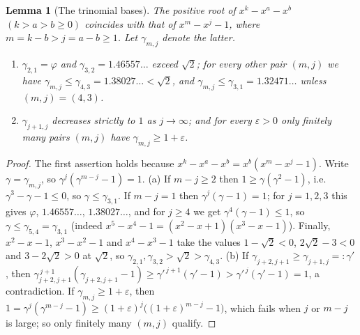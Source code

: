 \documentclass[11pt]{amsart}
\newtheorem{lemma}{Lemma}[section]
\theoremstyle{definition}
\theoremstyle{remark}
\begin{document}
\begin{lemma}[The trinomial bases]\label{lem:trinroots}
The positive root of $x^k-x^a-x^b$ $(k>a>b\ge0)$ coincides with that of $x^m-x^j-1$, where
$m=k-b>j=a-b\ge1$. Let $\gamma_{m,j}$ denote the latter.
\begin{enumerate}[label=(\alph*)]
\item $\gamma_{2,1}=\varphi$ and $\gamma_{3,2}=1.46557\ldots$ exceed $\sqrt2$; for every other
pair $(m,j)$ we have $\gamma_{m,j}\le\gamma_{4,3}=1.38027\ldots<\sqrt2$, and
$\gamma_{m,j}\le\gamma_{3,1}=1.32471\ldots$ unless $(m,j)=(4,3)$.
\item $\gamma_{j+1,j}$ decreases strictly to $1$ as $j\to\infty$; and for every
$\varepsilon>0$ only finitely many pairs $(m,j)$ have $\gamma_{m,j}\ge1+\varepsilon$.
\end{enumerate}
\end{lemma}

\begin{proof}
The first assertion holds because $x^k-x^a-x^b=x^b(x^m-x^j-1)$. Write $\gamma=\gamma_{m,j}$,
so $\gamma^j(\gamma^{m-j}-1)=1$.
(a) If $m-j\ge2$ then $1\ge\gamma(\gamma^2-1)$, i.e.\ $\gamma^3-\gamma-1\le0$, so
$\gamma\le\gamma_{3,1}$. If $m-j=1$ then $\gamma^j(\gamma-1)=1$; for $j=1,2,3$ this gives
$\varphi$, $1.46557\ldots$, $1.38027\ldots$, and for $j\ge4$ we get $\gamma^4(\gamma-1)\le1$,
so $\gamma\le\gamma_{5,4}=\gamma_{3,1}$ (indeed $x^5-x^4-1=(x^2-x+1)(x^3-x-1)$). Finally,
$x^2-x-1$, $x^3-x^2-1$ and $x^4-x^3-1$ take the values $1-\sqrt2<0$, $2\sqrt2-3<0$ and
$3-2\sqrt2>0$ at $\sqrt2$, so $\gamma_{2,1},\gamma_{3,2}>\sqrt2>\gamma_{4,3}$.
(b) If $\gamma_{j+2,j+1}\ge\gamma_{j+1,j}=:\gamma'$, then
$\gamma_{j+2,j+1}^{\,j+1}(\gamma_{j+2,j+1}-1)\ge\gamma'^{\,j+1}(\gamma'-1)>\gamma'^{\,j}(\gamma'-1)=1$,
a contradiction. If $\gamma_{m,j}\ge1+\varepsilon$, then
$1=\gamma^j(\gamma^{m-j}-1)\ge(1+\varepsilon)^j\bigl((1+\varepsilon)^{m-j}-1\bigr)$, which
fails when $j$ or $m-j$ is large; so only finitely many $(m,j)$ qualify.
\end{proof}
\end{document}
